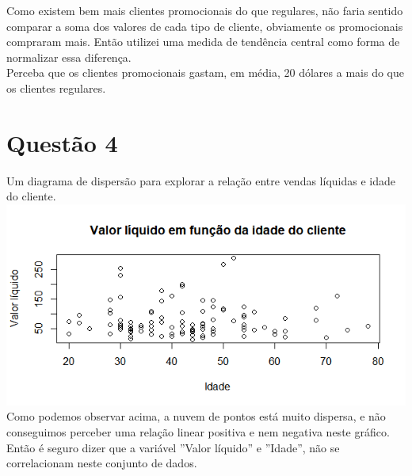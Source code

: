 \documentclass[a4paper,12pt]{article}
\begin{document}
Como existem bem mais clientes promocionais do que regulares, não faria sentido comparar a soma dos valores de cada tipo de cliente, obviamente os promocionais compraram mais. Então utilizei uma medida de tendência central como forma de normalizar essa diferença.\\
Perceba que os clientes promocionais gastam, em média, 20 dólares a mais do que os clientes regulares.\\

\section{Questão 4}
Um diagrama de dispersão para explorar a relação entre vendas líquidas e idade do cliente.\\
\includegraphics[]{valorl.png}\\

Como podemos observar acima, a nuvem de pontos está muito dispersa, e não conseguimos perceber uma relação linear positiva e nem negativa neste gráfico.\\

Então é seguro dizer que a variável ''Valor líquido'' e ''Idade'', não se correlacionam neste conjunto de dados.
\end{document}
